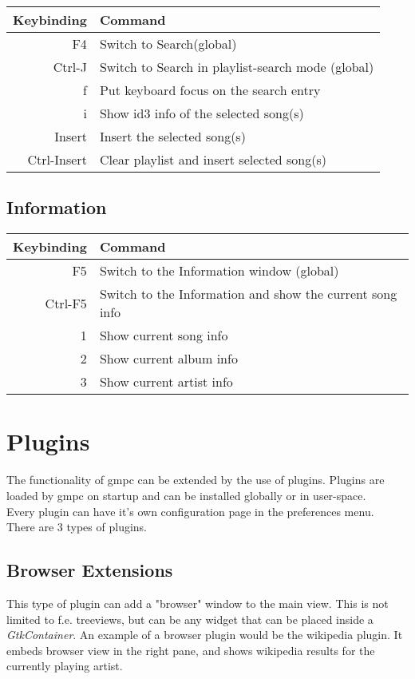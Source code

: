 \documentclass{article}
\begin{document}
\begin{tabular}{r|l}
Keybinding&Command\\
\hline 
F4&Switch to Search(global)\\
Ctrl-J&Switch to Search in playlist-search mode (global)\\
f&Put keyboard focus on the search entry\\
i&Show id3 info of the selected song(s)\\
Insert&Insert the selected song(s)\\                     
Ctrl-Insert&Clear playlist and insert selected song(s)\\
\end{tabular}


\subsection{Information}
\begin{tabular}{r|l}
Keybinding&Command\\
\hline 
F5&Switch to the Information window (global)\\
Ctrl-F5&Switch to the Information and show the current song info\\
1&Show current song info\\
2&Show current album info\\
3&Show current artist info\\
\end{tabular}

\section{Plugins}
The functionality of gmpc can be extended by the use of plugins. Plugins are loaded by gmpc on startup and can be installed globally or in user-space.\\
Every plugin can have it's own configuration page in the preferences menu.\\
There are 3 types of plugins.\\

\subsection {Browser Extensions}
This type of plugin can add a "browser" window to the main view. This is not limited to f.e. treeviews, but can be any widget that can be placed inside a \textit{GtkContainer}. An example of a browser plugin would be the wikipedia plugin. It embeds browser view in the right pane, and shows wikipedia results for the currently playing artist.
\end{document}
